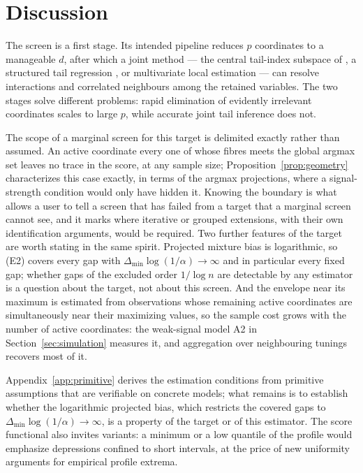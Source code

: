\section{Discussion}\label{sec:discussion}

The screen is a first stage. Its intended
pipeline reduces $p$ coordinates to a manageable $d$, after which a joint
method --- the central tail-index subspace of \citet{gardesPodgorny2025}, a
structured tail regression \citep{wangTsai2009,sasakiTaoWang2026}, or
multivariate local estimation --- can resolve interactions and correlated
neighbours among the retained variables. The two stages solve different
problems: rapid elimination of evidently irrelevant coordinates scales
to large $p$, while accurate joint tail inference does not.

The scope of a marginal screen for this target is delimited exactly
rather than assumed. An active coordinate every one of whose fibres
meets the global argmax set leaves no trace in the score, at any sample
size; Proposition~\ref{prop:geometry} characterizes this case exactly,
in terms of the argmax projections, where a signal-strength condition
would only have hidden it. Knowing the boundary is what allows a user
to tell a screen that has failed from a target that a marginal screen
cannot see, and it marks where iterative or grouped extensions, with
their own identification arguments, would be required. Two further
features of the target are worth stating in the same spirit. Projected
mixture bias is logarithmic, so (E2) covers every gap with
$\Delta_{\min}\log(1/\alpha)\to\infty$ and in particular every fixed
gap; whether gaps of the excluded order $1/\log n$ are detectable by
any estimator is a question about the target, not about this screen.
And the envelope near its maximum is estimated from observations whose
remaining active coordinates are simultaneously near their maximizing
values, so the sample cost grows with the number of active coordinates:
the weak-signal model A2 in Section~\ref{sec:simulation} measures it,
and aggregation over neighbouring tunings recovers most of it.

Appendix~\ref{app:primitive} derives the estimation conditions from
primitive assumptions that are verifiable on concrete models; what
remains is to establish whether the logarithmic projected bias, which
restricts the covered gaps to $\Delta_{\min}\log(1/\alpha)\to\infty$, is a
property of the target or of this estimator. The score functional also
invites variants: a minimum or a low quantile of the profile would
emphasize depressions confined to short intervals, at the price of new
uniformity arguments for empirical profile extrema.


